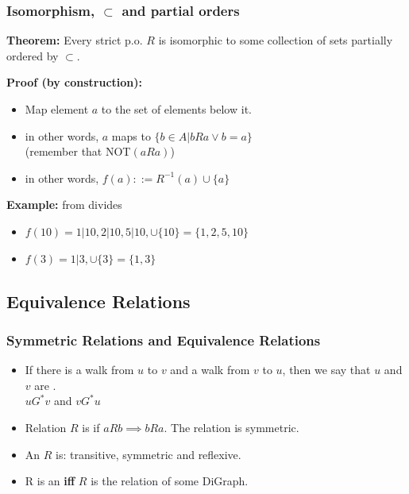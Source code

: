 \documentclass{beamer}
\begin{document}
\begin{frame}
  \frametitle{Isomorphism, $\subset$ and partial orders}

  {\larger
    {\bf Theorem:} Every strict p.o. $R$ is isomorphic to some
    collection of sets partially ordered by $\subset$.

    \bigskip

    {\bf Proof (by construction):}
    \begin{itemize}
    \item Map element $a$ to the set of elements below it.
    \item in other words, $a$ maps to $\{b \in A| bRa \lor b = a\}$\\
      \hfill(remember that NOT$(aRa)$)
    \item in other words, $f(a) ::= R^{-1}(a) \cup \{a\}$
    \end{itemize}

    \bigskip

    {\bf Example:} from divides
    \begin{itemize}
    \item $f(10) = 1|10, 2|10, 5|10, \cup \{10\} = \{1,2,5,10\}$
    \item $f(3) = 1|3, \cup \{3\} = \{1,3\}$
    \end{itemize}
  }
\end{frame}

\subsection{Equivalence Relations}

\begin{frame}
  \frametitle{Symmetric Relations and Equivalence Relations}

  {\larger
    \begin{itemize}
    \item If there is a walk from $u$ to $v$ and a walk from $v$ to
      $u$, then we say that $u$ and $v$ are .\\
      $uG^*v$ and $vG^*u$

      \bigskip

    \item Relation $R$ is  if $aRb \implies bRa$. The  relation is symmetric.

      \bigskip

    \item An  $R$ is: transitive,
      symmetric and reflexive.

      \bigskip

    \item R is an  {\bf iff} $R$ is
      the  relation of some DiGraph.

    \end{itemize}
  }
\end{frame}
\end{document}
